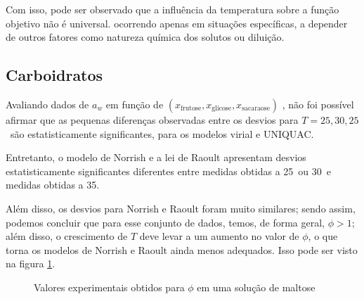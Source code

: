 \documentclass[
	12pt,				%
	openright,
	twoside,
	a4paper,			%
	english,			%
	french,				%
	spanish,			%
	brazil				%
	]{abntex2}
\begin{document}
Com isso, pode ser observado que a influência da temperatura sobre a função
objetivo não é universal. ocorrendo apenas em situações específicas, a
depender de outros fatores como natureza química dos solutos ou diluição.

\subsection{Carboidratos}

Avaliando dados de $a_w$ em função de $(x_\text{frutose},x_\text{glicose},%
x_\text{sacaraose})$ \cite{velezmoro2000}, não foi possível afirmar que
as pequenas diferenças observadas entre os desvios para $T=25,30,25$
\textcelsius\ são estatisticamente significantes, para os modelos
virial e UNIQUAC.

Entretanto, o modelo de Norrish e a lei de Raoult apresentam desvios
estatisticamente significantes diferentes entre medidas obtidas a
25\textcelsius\ ou 30\textcelsius\ e medidas obtidas a 35\textcelsius.

Além disso, os desvios para Norrish e Raoult foram muito similares; sendo
assim, podemos concluir que para esse conjunto de dados, temos, de forma
geral, $\phi>1$; além disso, o crescimento de $T$ deve levar a um aumento
no valor de $\phi$, o que torna os modelos de Norrish e Raoult ainda menos
adequados. Isso pode ser visto na figura \ref{fig_temp_carbs}.

\begin{figure}[h]
	\centering
	\caption{Valores experimentais obtidos para $\phi$ em uma solução de maltose}
	\label{fig_temp_carbs}
\end{figure}
\end{document}
